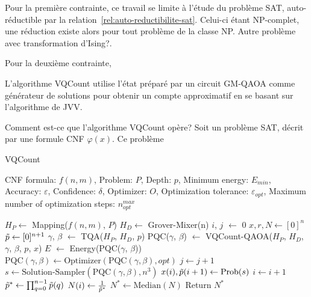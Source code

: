 Pour la première contrainte, ce travail se limite à l'étude du problème SAT, auto-réductible par la relation~\ref{rel:auto-reductibilite-sat}. Celui-ci étant \textsf{NP}-complet, une réduction existe alors pour tout problème de la classe \textsf{NP}. \textsf{Autre problème avec transformation d'Ising?}. 

Pour la deuxième contrainte, 





L'algorithme VQCount utilise l'état préparé par un circuit GM-QAOA comme générateur de solutions pour obtenir un compte approximatif en se basant sur l'algorithme de JVV. 

Comment est-ce que l'algorithme VQCount opère? Soit un problème SAT, décrit par une formule CNF $\varphi(x)$. Ce problème   




\begin{algorithm}[b!]
    \caption{VQCount}\label{alg:vqcount}
    \begin{algorithmic}[1]
    \REQUIRE CNF formula: $f(n, m)$, Problem: $P$,  Depth: $p$, Minimum energy: $E_{min}$, Accuracy: $\varepsilon$, Confidence: $\delta$, Optimizer: $O$, Optimization tolerance: $\varepsilon_{opt}$, Maximum number of optimization steps: $n_{opt}^{max}$
    
    \STATE $H_P \leftarrow$ Mapping($f(n, m)$, $P$)
    \STATE $H_D \leftarrow$ Grover-Mixer(n)
    \STATE $i$, $j$ $\leftarrow$ $0$
    \STATE $x, r, N \leftarrow [0]^n$
    \STATE $\Tilde{p} \leftarrow [0]^{n+1}$
    \STATE $\gamma$, $\beta$ $\leftarrow$ TQA($H_P$, $H_D$, $p$)
    \STATE PQC($\gamma$, $\beta$)  $\leftarrow$ VQCount-QAOA($H_P$, $H_D$, $\gamma$, $\beta$, $p$, $x$)
    \STATE $E$ $\leftarrow$ Energy(PQC($\gamma$, $\beta$))
    \STATE $\text{PQC}(\gamma, \beta) \leftarrow \text{Optimizer}(\text{PQC}(\gamma, \beta), opt)$
    \STATE $j \leftarrow j + 1$
    \ENDWHILE
    \STATE $s \leftarrow \text{Solution-Sampler}(\text{PQC}(\gamma, \beta), n^3)$
    \STATE $x(i), \Tilde{p}(i+1) \leftarrow \text{Prob}(s)$
    \STATE $i \leftarrow i + 1$
    \ENDWHILE
    \STATE $ \Tilde{p}^* \leftarrow \prod_{q = 0}^{n-1}\Tilde{p}(q)$
    \STATE $N(i) \leftarrow \frac{1}{\Tilde{p}^*}$
    \ENDFOR
    \STATE $N^* \leftarrow \text{Median}(N)$
    \STATE Return $N^*$
    \end{algorithmic}
\end{algorithm}
    


